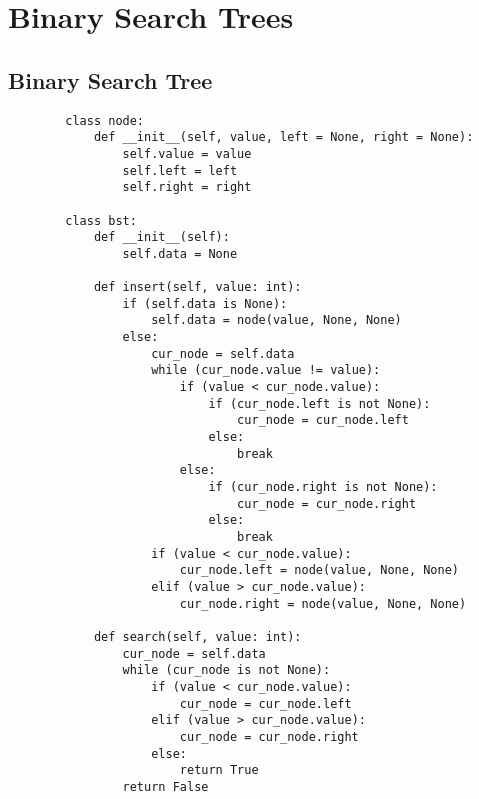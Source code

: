 \newpage

\section[Day 9: Binary Search Trees]{ Binary Search Trees }

\subsection{ Binary Search Tree }

    \begin{lstlisting}
        class node:
            def __init__(self, value, left = None, right = None):
                self.value = value
                self.left = left
                self.right = right

        class bst:
            def __init__(self):
                self.data = None
            
            def insert(self, value: int):
                if (self.data is None):
                    self.data = node(value, None, None)
                else:
                    cur_node = self.data
                    while (cur_node.value != value):
                        if (value < cur_node.value):
                            if (cur_node.left is not None):
                                cur_node = cur_node.left
                            else:
                                break
                        else:
                            if (cur_node.right is not None):
                                cur_node = cur_node.right
                            else:
                                break
                    if (value < cur_node.value):
                        cur_node.left = node(value, None, None)
                    elif (value > cur_node.value):
                        cur_node.right = node(value, None, None)
                    
            def search(self, value: int):
                cur_node = self.data
                while (cur_node is not None):
                    if (value < cur_node.value):
                        cur_node = cur_node.left
                    elif (value > cur_node.value):
                        cur_node = cur_node.right
                    else:
                        return True
                return False
            

\end{lstlisting}
